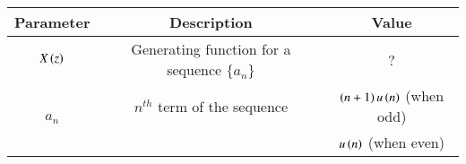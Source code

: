 \begin{tabular}{|c|c|c|}
   \hline
    \textbf{Parameter} & \textbf{Description} & \textbf{Value} \\
   \hline
   $ X\left(z\right)$ & Generating function for a sequence $\bigl\{ a_n \bigl\}$ & ? \\
   \hline
   \multirow{2}{*}{$a_n$} & $n^{th}$ term of the sequence & $\left(n+1\right)u\left(n\right)$ (when odd) \\
   \cline{3-3}
   & & $u\left(n\right)$ (when even) \\
   \hline
\end{tabular}
